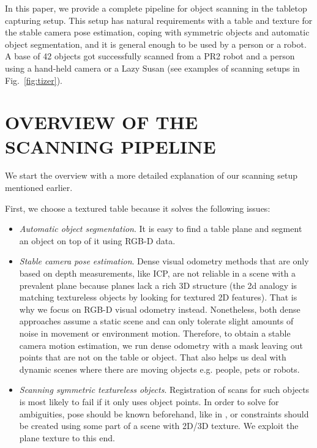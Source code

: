 \documentclass[letterpaper, 10 pt, conference]{ieeeconf}  %
\begin{document}
In this paper, we provide a complete pipeline for object scanning
in the tabletop capturing setup. This setup has natural requirements
with a table and texture for the stable camera pose estimation,
coping with symmetric objects and automatic object segmentation, and it is general enough
to be used by a person or a robot. A base of 42 objects
got successfully scanned from a PR2 robot and a person using a hand-held camera or a Lazy Susan (see 
examples of scanning setups in Fig.~\ref{fig:tizer}).

\section{OVERVIEW OF THE SCANNING PIPELINE}

\label{sec:overview}

We start the overview with a more detailed explanation
of our scanning setup mentioned earlier.

First, we choose a textured table because it solves the following issues:

\begin{itemize}

\item \textit{Automatic object segmentation}. It is easy to find a table plane and segment an object on top of 
it using RGB-D data.
\item \textit{Stable camera pose estimation}. Dense visual odometry methods that are only based on depth measurements,
like ICP, are not reliable in a scene with a prevalent plane \cite{rusinkiewicz2002real}
because planes lack a rich 3D structure (the 2d analogy is matching textureless objects by 
looking for textured 2D 
features). That is why we focus on RGB-D visual odometry instead. Nonetheless, both dense approaches
assume a static scene and can only tolerate slight amounts of noise in movement or environment motion. Therefore,
to obtain a stable camera motion estimation, we run dense odometry with a mask leaving out points that are not on 
the table or object. That also helps us deal with dynamic scenes where there are moving objects e.g. people, pets or 
robots.
\item \textit{Scanning symmetric textureless objects}. Registration of scans for such objects
is most likely to fail if it only uses object points. In order to solve for ambiguities, pose should be known 
beforehand, like in \cite{krainin2011manipulator},
or constraints should be created using some part of a scene with
2D/3D texture. We exploit the plane texture to this end.
\end{itemize}
\end{document}
